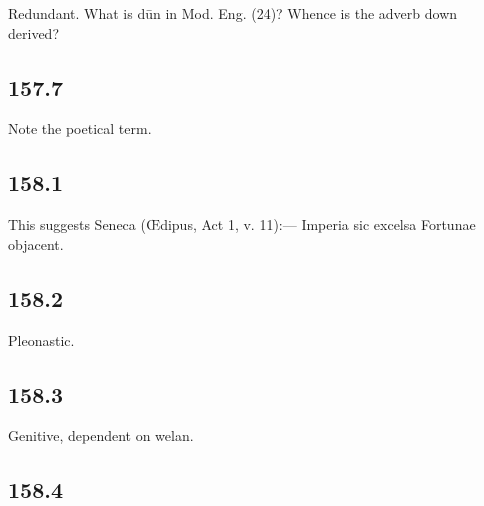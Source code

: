 Redundant. What is dūn in Mod. Eng. (24)? Whence is the adverb down derived?

\subsection*{157.7}

Note the poetical term.

\subsection*{158.1}

This suggests Seneca (Œdipus, Act 1, v. 11):— Imperia sic excelsa Fortunae objacent.

\subsection*{158.2}

Pleonastic.

\subsection*{158.3}

Genitive, dependent on welan.

\subsection*{158.4}

